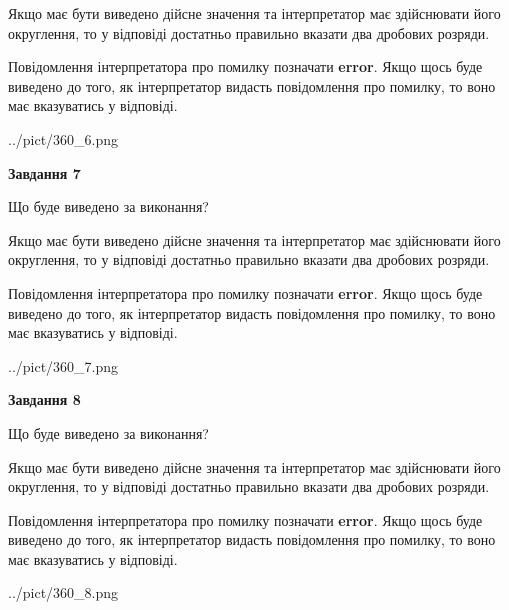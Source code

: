 \documentclass[12pt, ukrainian]{article}
\begin{document}
{\begin {Large}
Якщо має бути виведено дійсне значення та інтерпретатор має здійснювати його округлення, 
то у відповіді достатньо правильно вказати два дробових розряди.

Повідомлення інтерпретатора про помилку позначати \textbf{error}.
Якщо щось буде виведено до того, як інтерпретатор видасть повідомлення про помилку, 
то воно має вказуватись у відповіді. \par

\begin{center}
	{../pict/360_6.png}
\end{center}
\newpage

{\begin {center}\textbf{Завдання 7}\end {center}}\par
Що буде виведено за виконання? \par

Якщо має бути виведено дійсне значення та інтерпретатор має здійснювати його округлення, 
то у відповіді достатньо правильно вказати два дробових розряди.

Повідомлення інтерпретатора про помилку позначати \textbf{error}.
Якщо щось буде виведено до того, як інтерпретатор видасть повідомлення про помилку, 
то воно має вказуватись у відповіді. \par

\begin{center}
	{../pict/360_7.png}
\end{center}
\newpage

{\begin {center}\textbf{Завдання 8}\end {center}}\par
Що буде виведено за виконання? \par

Якщо має бути виведено дійсне значення та інтерпретатор має здійснювати його округлення, 
то у відповіді достатньо правильно вказати два дробових розряди.

Повідомлення інтерпретатора про помилку позначати \textbf{error}.
Якщо щось буде виведено до того, як інтерпретатор видасть повідомлення про помилку, 
то воно має вказуватись у відповіді. \par

\begin{center}
	{../pict/360_8.png}
\end{center}
\newpage


\end{Large}}
\end{document}
